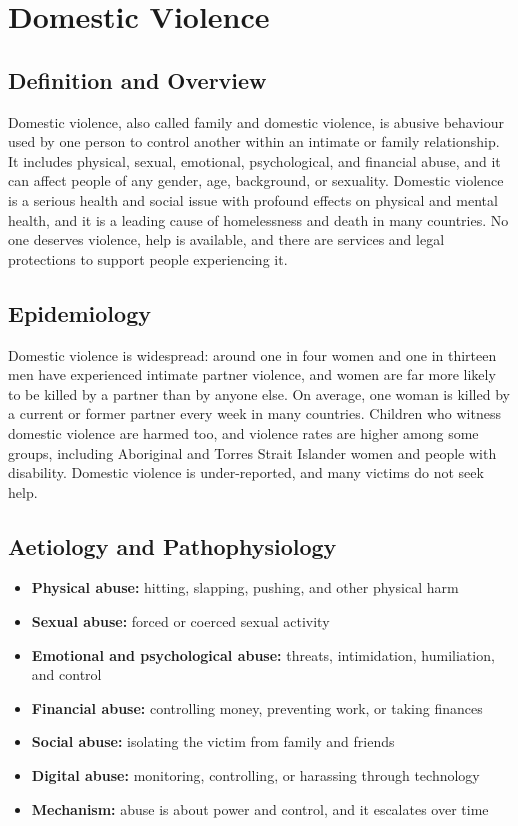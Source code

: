 \chapter{Domestic Violence}

\section*{Definition and Overview}
Domestic violence, also called family and domestic violence, is abusive behaviour used by one person to control another within an intimate or family relationship. It includes physical, sexual, emotional, psychological, and financial abuse, and it can affect people of any gender, age, background, or sexuality. Domestic violence is a serious health and social issue with profound effects on physical and mental health, and it is a leading cause of homelessness and death in many countries. No one deserves violence, help is available, and there are services and legal protections to support people experiencing it.

\section*{Epidemiology}
Domestic violence is widespread: around one in four women and one in thirteen men have experienced intimate partner violence, and women are far more likely to be killed by a partner than by anyone else. On average, one woman is killed by a current or former partner every week in many countries. Children who witness domestic violence are harmed too, and violence rates are higher among some groups, including Aboriginal and Torres Strait Islander women and people with disability. Domestic violence is under-reported, and many victims do not seek help.

\section*{Aetiology and Pathophysiology}
\begin{itemize}
    \item \textbf{Physical abuse:} hitting, slapping, pushing, and other physical harm
    \item \textbf{Sexual abuse:} forced or coerced sexual activity
    \item \textbf{Emotional and psychological abuse:} threats, intimidation, humiliation, and control
    \item \textbf{Financial abuse:} controlling money, preventing work, or taking finances
    \item \textbf{Social abuse:} isolating the victim from family and friends
    \item \textbf{Digital abuse:} monitoring, controlling, or harassing through technology
    \item \textbf{Mechanism:} abuse is about power and control, and it escalates over time
\end{itemize}

